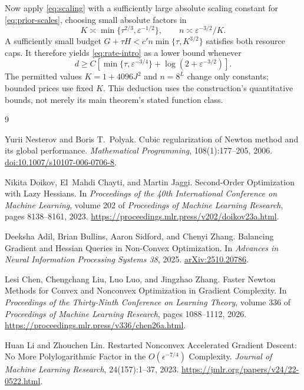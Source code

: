 \documentclass[11pt]{article}
\theoremstyle{definition}
\theoremstyle{remark}
\newcommand{\eps}{\varepsilon}
\begin{document}
Now apply \eqref{eq:scaling} with a sufficiently large absolute scaling
constant for \eqref{eq:prior-scales}, choosing small absolute factors in
\[
 K\asymp\min\{\tau^{2/3},\eps^{-1/2}\},\qquad
 n\asymp\eps^{-3/2}/K.
\]
A sufficiently small budget
$G+\tau H<c'n\min\{\tau,K^{3/2}\}$ satisfies both resource caps.
It therefore yields \eqref{eq:rate-intro} as a lower bound whenever
\[
 d\ge C\left[\min\{\tau,\eps^{-3/4}\}+\log(2+\eps^{-3/2})\right].
\]
The permitted values $K=1+4096J^2$ and $n=8^L$ change only constants;
bounded prices use fixed $K$. This deduction uses the construction's
quantitative bounds, not merely its main theorem's stated function class.

\begingroup
\small
\setlength{\bibsep}{3pt plus 1pt}
\begin{thebibliography}{9}

Yurii Nesterov and Boris T.~Polyak.
\newblock Cubic regularization of Newton method and its global performance.
\newblock \emph{Mathematical Programming}, 108(1):177--205, 2006.
\newblock \href{https://doi.org/10.1007/s10107-006-0706-8}{doi:10.1007/s10107-006-0706-8}.

Nikita Doikov, El~Mahdi Chayti, and Martin Jaggi.
\newblock Second-Order Optimization with Lazy Hessians.
\newblock In \emph{Proceedings of the 40th International Conference on
Machine Learning}, volume 202 of \emph{Proceedings of Machine Learning
Research}, pages 8138--8161, 2023.
\newblock \url{https://proceedings.mlr.press/v202/doikov23a.html}.

Deeksha Adil, Brian Bullins, Aaron Sidford, and Chenyi Zhang.
\newblock Balancing Gradient and Hessian Queries in Non-Convex Optimization.
\newblock In \emph{Advances in Neural Information Processing Systems 38}, 2025.
\newblock \href{https://arxiv.org/abs/2510.20786}{arXiv:2510.20786}.

Lesi Chen, Chengchang Liu, Luo Luo, and Jingzhao Zhang.
\newblock Faster Newton Methods for Convex and Nonconvex Optimization in
Gradient Complexity.
\newblock In \emph{Proceedings of the Thirty-Ninth Conference on Learning
Theory}, volume 336 of \emph{Proceedings of Machine Learning Research},
pages 1088--1112, 2026.
\newblock \url{https://proceedings.mlr.press/v336/chen26a.html}.

Huan Li and Zhouchen Lin.
\newblock Restarted Nonconvex Accelerated Gradient Descent:
No More Polylogarithmic Factor in the $O(\epsilon^{-7/4})$ Complexity.
\newblock \emph{Journal of Machine Learning Research}, 24(157):1--37, 2023.
\newblock \url{https://jmlr.org/papers/v24/22-0522.html}.


\end{thebibliography}
\end{document}
